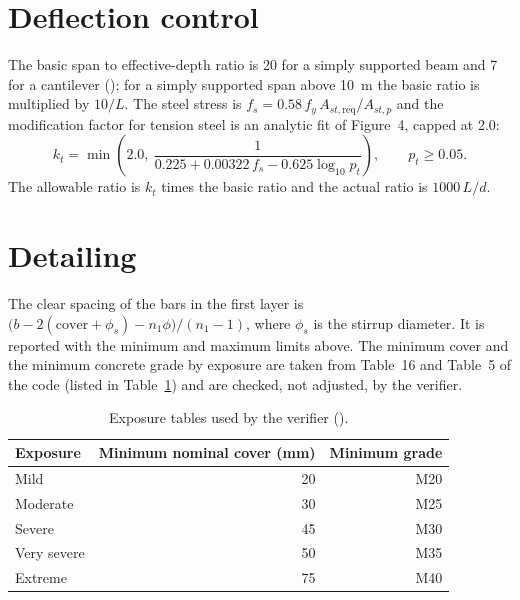 \section{Deflection control}
The basic span to effective-depth ratio is 20 for a simply supported beam and 7 for a cantilever (); for a simply supported span above 10~m the basic ratio is multiplied by $10/L$. The steel stress is $f_s = 0.58\,f_y\,A_{st,\mathrm{req}}/A_{st,p}$ and the modification factor for tension steel is an analytic fit of Figure~4, capped at 2.0:
\begin{equation}
  k_t = \min\!\left(2.0,\ \frac{1}{0.225 + 0.00322\,f_s - 0.625\log_{10}p_t}\right), \qquad p_t \ge 0.05.
\end{equation}
The allowable ratio is $k_t$ times the basic ratio and the actual ratio is $1000\,L/d$.

\section{Detailing}
The clear spacing of the bars in the first layer is $\bigl(b - 2(\text{cover}+\phi_s) - n_1\phi\bigr)/(n_1-1)$, where $\phi_s$ is the stirrup diameter. It is reported with the minimum and maximum limits above. The minimum cover and the minimum concrete grade by exposure are taken from Table~16 and Table~5 of the code (listed in Table~\ref{tab:exposure}) and are checked, not adjusted, by the verifier.

\begin{table}[H]
\centering
\caption{Exposure tables used by the verifier ().}\label{tab:exposure}
\begin{tabular}{@{}lrr@{}}
\toprule
Exposure & Minimum nominal cover (mm) & Minimum grade \\
\midrule
Mild & 20 & M20 \\
Moderate & 30 & M25 \\
Severe & 45 & M30 \\
Very severe & 50 & M35 \\
Extreme & 75 & M40 \\
\bottomrule
\end{tabular}
\end{table}

